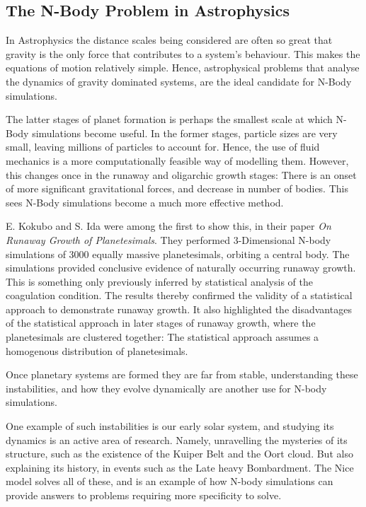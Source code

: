 \documentclass[a4paper,10pt]{article}
\begin{document}
\subsection{The N-Body Problem in Astrophysics}

In Astrophysics the distance scales being considered are often so great that gravity is the only force that contributes to a system's behaviour. This makes the equations of motion relatively simple. Hence, astrophysical problems that analyse the dynamics of gravity dominated systems, are the ideal candidate for N-Body simulations.

The latter stages of planet formation is perhaps the smallest scale at which N-Body simulations become useful. In the former stages, particle sizes are very small, leaving millions of particles to account for. Hence, the use of fluid mechanics is a more computationally feasible way of modelling them. However, this changes once in the runaway and oligarchic growth stages: There is an onset of more significant gravitational forces, and decrease in number of bodies. This sees N-Body simulations become a much more effective method. 

E. Kokubo and S. Ida were among the first to show this, in their paper \textit{On Runaway Growth of Planetesimals}\cite{Runaway}. They performed 3-Dimensional N-body simulations of 3000 equally massive planetesimals, orbiting a central body. The simulations provided conclusive evidence of naturally occurring runaway growth. This is something only previously inferred by statistical analysis of the coagulation condition\cite{Statistics,Coagulation}. The results thereby confirmed the validity of a statistical approach to demonstrate runaway growth. It also highlighted the disadvantages of the statistical approach in later stages of runaway growth, where the planetesimals are clustered together: The statistical approach assumes a homogenous distribution of planetesimals.

Once planetary systems are formed they are far from stable, understanding these instabilities, and how they evolve dynamically are another use for N-body simulations. 

One example of such instabilities is our early solar system, and studying its dynamics is an active area of research. Namely, unravelling the mysteries of its structure, such as the existence of the Kuiper Belt and the Oort cloud. But also explaining its history, in events such as the Late heavy Bombardment. The Nice model solves all of these, and is an example of how N-body simulations can provide answers to problems requiring more specificity to solve. 
\end{document}
